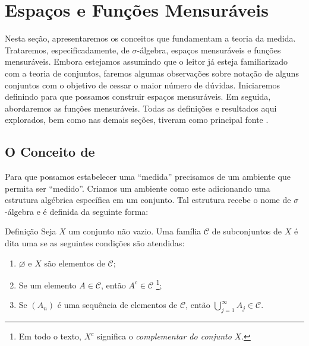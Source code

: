 \chapter{Espaços e Funções Mensuráveis}

Nesta seção, apresentaremos os conceitos que fundamentam a teoria da medida. Trataremos, especificadamente, de $\sigma$-álgebra, espaços mensuráveis e funções mensuráveis. 
Embora estejamos assumindo que o leitor já esteja familiarizado com a teoria de conjuntos, faremos algumas observações sobre notação de alguns conjuntos com o objetivo de cessar o maior número de dúvidas.
Iniciaremos definindo \sigal para que possamos construir espaços mensuráveis.
Em seguida, abordaremos as funções mensuráveis.
Todas as definições e resultados aqui explorados, bem como nas demais seções,  tiveram como principal fonte \cite{bartle}.

\section{O Conceito de \sigal}
Para que possamos estabelecer uma \enquote{medida} precisamos de um ambiente que permita ser \enquote{medido}. 
Criamos um ambiente como este adicionando uma estrutura algébrica específica em um conjunto.
Tal estrutura recebe o nome de $\sigma$-álgebra e é definida da seguinte forma:
\begin{resultado}{Definição}
\label{def:sigma-algebra}
    Seja $X$ um conjunto não vazio. Uma família $\mathcal{C}$ de subconjuntos de $X$ é dita uma \sigal se as seguintes condições são atendidas:
    \begin{enumerate}[label*= (\roman*)]
        \item $\varnothing$ e $X$ são elementos de $\mathcal{C}$;     
        \item Se um elemento $A \in \mathcal{C}$, então $A^c \in \mathcal{C}$
        \footnote{Em todo o texto, $X^c$ significa o \textit{complementar do conjunto} $X$.};
        \item Se $(A_n)$ é uma sequência de elementos de $\mathcal{C}$, 
        então $\displaystyle \bigcup_{j = 1}^\infty A_j \in \mathcal{C}$.
    \end{enumerate}

\end{resultado}

